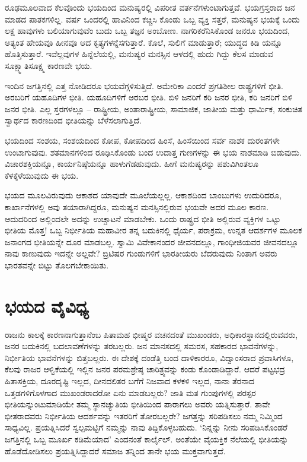\vskip 2pt

ರೂಢಮೂಲವಾದ ಕೆಲವೊಂದು ಭಯದಿಂದ ಮನುಷ್ಯರಲ್ಲಿ ವಿಪರೀತ ವರ್ತನೆಗಳುಂಟಾಗುತ್ತವೆ. ಭಯಗ್ರಸ್ತರಾದ ಜನ ಮಾಡದ ಪಾತಕಗಳಿಲ್ಲ. ವರ್ಷ ಒಂದರಲ್ಲಿ ಹಾವಿನಿಂದ ಕಚ್ಚಿಸಿ ಕೊಂಡು ಒಬ್ಬ ವ್ಯಕ್ತಿ ಸತ್ತರೆ, ಮನುಷ್ಯನ ಭಯಕ್ಕೆ ಒಂದು ಲಕ್ಷ ಹಾವುಗಳು ಬಲಿಯಾಗುವುವೆಂ ಬುದು ಒಬ್ಬ ತಜ್ಞನ ಅಂಬೋಣ. ನಾಗರಿಕರೆನಿಸಿಕೊಂಡ ಜನರೂ ಭಯದಿಂದ, ಅತ್ಯಂತ ಹೇಯವೂ ಹೀನವೂ ಆದ ಕೃತ್ಯಗಳನ್ನೆಸಗುತ್ತಾರೆ. ಕೊಲೆ, ಸುಲಿಗೆ ಮಾಡುತ್ತಾರೆ; ಯುದ್ಧದ ಕಿಡಿ ಯನ್ನೂ ಹೊತ್ತಿಸುತ್ತಾರೆ. ಇವೆಲ್ಲವುಗಳ ಹಿನ್ನೆಲೆಯಲ್ಲಿ, ಮನುಷ್ಯರ ಮನಸ್ಸಿನ ಆಳದಲ್ಲಿ ಹುದು ಗಿದ್ದು ಕೆಲಸ ಮಾಡುವ ಸೂಕ್ಷ್ಮಾತಿಸೂಕ್ಷ್ಮ ಕಾರಣವೇ ಭಯ.

\vskip 2pt

ಇಂದಿನ ಜಗತ್ತಿನಲ್ಲಿ ಎತ್ತ ನೋಡಿದರೂ ಭಯವೆಗ್ಗಳಿಸುತ್ತಿದೆ. ಅಮೇರಿಕಾ ಎಂದರೆ ಪ್ರಗತಿಶೀಲ ರಾಷ್ಟ್ರಗಳಿಗೆ ಭೀತಿ. ಅರಬರಿಗೆ ಯಹೂದಿಗಳ ಭೀತಿ. ಯಹೂದಿಗಳಿಗೆ ಅರಬರ ಭೀತಿ. ಬಿಳಿ ಜನರಿಗೆ ಕರಿ ಜನರ ಭೀತಿ, ಕರಿ ಜನರಿಗೆ ಬಿಳಿ ಜನರ ಭೀತಿ. ಎಲ್ಲ ಸ್ತರಗಳಲ್ಲೂ – ರಾಷ್ಟ್ರೀಯ, ಅಂತಾರಾಷ್ಟ್ರೀಯ, ಸಾಮಾಜಿಕ, ಜಾತೀಯ ಮತ್ತು ಧಾರ್ಮಿಕ, ಸಂಕುಚಿತ ಸ್ವಾರ್ಥದ ಕಾರಣದಿಂದ ಭೀತಿಯನ್ನು ಬೆಳೆಸಲಾಗುತ್ತಿದೆ.

ಭಯದಿಂದ ಸಂಶಯ, ಸಂಶಯದಿಂದ ಕೋಪ, ಕೋಪದಿಂದ ಹಿಂಸೆ, ಹಿಂಸೆಯಿಂದ ಸರ್ವ ನಾಶಕ ದುರಂತಗಳೇ ಉಂಟಾಗುವುವು. ಶತಮಾನಗಳಿಂದ ರೂಢಿಸಿಕೊಂಡು ಬಂದ ಉದಾತ್ತ ಗುಣಗಳನ್ನು ಈ ಭಯ ನಾಶಮಾಡಿ ಬಿಡುವುದು. ವಿಚಾರಶಕ್ತಿಯನ್ನೂ, ಕಾರ್ಯನಿಷ್ಠೆಯನ್ನೂ ಹಾಳುಗೆಡಹುವುದು. ಹೀಗೆ ಮನುಷ್ಯರನ್ನು ಪಶುವಿಗಿಂತಲೂ ಕೆಳಕ್ಕೆಳೆಯುವುದು ಈ ಭಯ.

ಭಯದ ಮೂಲವಿರುವುದು ಆಕಾಶದ ಯಾವುದೇ ಮೂಲೆಯಲ್ಲಲ್ಲ. ಆಕಾಶದಿಂದ ಬಾಂಬುಗಳು ಉದುರಿದರೂ, ಕಾರ್ಖಾನೆಗಳಲ್ಲಿ ಅವು ತಯಾರಾಗಿದ್ದರೂ, ಮನುಷ್ಯನ ಮನಸ್ಸಿನಲ್ಲಿರುವ ಭಯವೇ ಅದರ ಮೂಲ ಕಾರಣ. ಆದುದರಿಂದ ಅಲ್ಲಿಂದಲೇ ಅದನ್ನು ಉಚ್ಚಾಟನೆ ಮಾಡಬೇಕು. ಒಂದು ರಾಷ್ಟ್ರದ ಭೀತಿ ಅಲ್ಲಿರುವ ವ್ಯಕ್ತಿಗಳ ಒಟ್ಟು ಭೀತಿಯ ಮೊತ್ತ! ಒಬ್ಬ ನಿರ್ಭೀತಿಯ ಮಹಾವೀರ ತನ್ನ ಬದುಕಿನಲ್ಲಿ ಧೈರ್ಯ, ಪರಾಕ್ರಮ, ಉನ್ನತ ಆದರ್ಶಗಳ ಮೂಲಕ ಜನಾಂಗದ ಭೀತಿಯನ್ನೇ ದೂರ ಮಾಡಬಲ್ಲ. ಸ್ವಾಮಿ ವಿವೇಕಾನಂದರ ಜೀವನದಲ್ಲೂ, ಗಾಂಧೀಜಿಯವರ ಜೀವನದಲ್ಲೂ ನಾವು ಕಾಣುವುದು ಇದನ್ನೇ ಅಲ್ಲವೇ? ಬ್ರಿಟಿಷರ ಗುಂಡುಗಳಿಗೆ ಭಾರತೀಯರು ಬೆದರುವುದು ನಿಂತಾಗ ಅವರು ಭಾರತವನ್ನೇ ಬಿಟ್ಟು ತೊಲಗಬೇಕಾಯಿತು.


\section*{ಭಯದ ವೈವಿಧ್ಯ}

\vskip -7pt

ರಾಜನು ಕಾಲಕ್ಕೆ ಕಾರಣನಾಗುತ್ತಾನೆಂಬ ಪಿತಾಮಹ ಭೀಷ್ಮರ ವಚನದಂತೆ ಮುಖಂಡರು, ಅಧಿಕಾರ\-ಸ್ಥಾನದಲ್ಲಿರುವವರು, ಜನರ ಬದುಕಿನಲ್ಲಿ ಬದಲಾವಣೆಗಳನ್ನು ತರಬಲ್ಲರು. ಜನ ಮಾನಸದಲ್ಲಿ ಸಮರಸ, ಸಹಕಾರದ ಭಾವನೆಗಳನ್ನು, ನಿರ್ಭೀತಿಯ ಭಾವನೆಗಳನ್ನು ಬಿತ್ತಬಲ್ಲರು. ಈ ದೇಶಕ್ಕೆ ದಂಡೆತ್ತಿ ಬಂದ ದಾಳಿಕಾರರೂ, ವಿದ್ವಾಂಸರಾದ ಪ್ರವಾಸಿಗಳೂ, ಕೆಲವು ರಾಜರ ಆಳ್ವಿಕೆಯಲ್ಲಿ ಇಲ್ಲಿನ ಜನರ ಪರಮಶ್ರೇಷ್ಠ ಚಾರಿತ್ರ್ಯವನ್ನು ಕಂಡು ಕೊಂಡಾಡಿದ್ದಾರೆ. ಆದರೆ ಪಟ್ಟಭದ್ರ ಹಿತಾಸಕ್ತಿಯ, ದೂರದೃಷ್ಟಿ ಇಲ್ಲದ, ದೀನದಲಿತರ ಬಗೆಗೆ ನಿಜವಾದ ಕಳಕಳಿ ಇಲ್ಲದ, ನಾನಾ ತೆರನಾದ ಒತ್ತಡಗಳಿಗೊಳಗಾದ ಮುಖಂಡರಾದರೋ ಏನು ಮಾಡಬಲ್ಲರು? ಜಾತಿ ಮತ ಗುಂಪುಗಳಲ್ಲಿ ಪರಸ್ಪರ ಭೀತಿಯನ್ನುಂಟುಮಾಡಿಯೇ ತಮ್ಮ ಸ್ಥಾನಚ್ಯುತಿಯ ಭೀತಿಯಿಂದ ಪಾರಾ\-ಗಲು ಅವರು ಯತ್ನಿಸುತ್ತಾರೆ. ತಾವೇ ಭೀತರಾದವರು ನಿರ್ಭೀತಿಯ ಆದರ್ಶವನ್ನು ಇತರರಿಗೆ ತೋರಬಲ್ಲರೇ? ಜಗತ್ತನ್ನು ಸರಿಪಡಿಸಲು ನಮ್ಮ ನಿಮ್ಮಿಂದ ಸಾಧ್ಯವಿಲ್ಲ. ಪ್ರಯತ್ನಿಸಿದರೆ ಸ್ವಲ್ಪಮಟ್ಟಿಗೆ ನಮ್ಮನ್ನು ನಾವು ತಿದ್ದಿಕೊಳ್ಳಬಹುದು. ‘ನಿನ್ನನ್ನು ನೀನು ಸರಿಪಡಿಸಿಕೊಂಡರೆ ಜಗತ್ತಿನಲ್ಲಿ ಒಬ್ಬ ಮೂರ್ಖ ಕಡಿಮೆಯಾದ’ ಎಂದನಂತೆ ಕಾರ್ಲೈಲ್. ಅಂತೆಯೇ ವೈಯಕ್ತಿಕ ನೆಲೆಯಲ್ಲಿ ಭೀತಿಯನ್ನು ಹೊಡೆದೋಡಿಸಲು ಪ್ರಯತ್ನಿಸಿದ್ದಾದರೆ ಸಮಾಜ ತನ್ನಿಂದ ತಾನೇ ಭಯ ಮುಕ್ತವಾಗುತ್ತದೆ.

